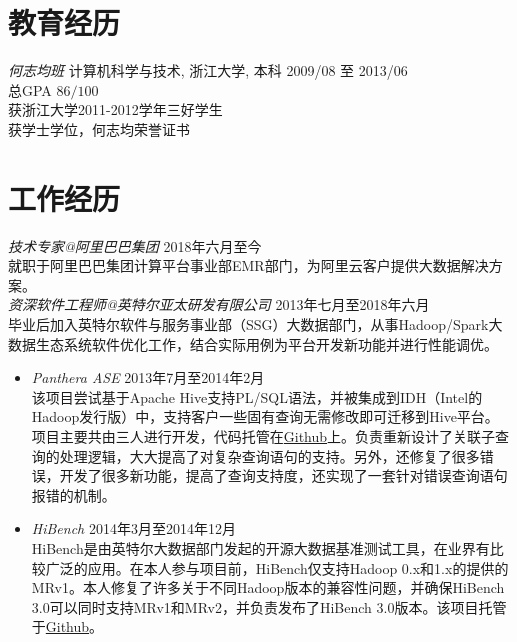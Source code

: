 \documentclass[line,margin]{res}
\begin{document}
\address{联系电话:\sl +86-152-1686-1267}
\address{E-mail:\sl me at daoyuan.wang}


\begin{resume}

\section{教育经历} {\sl 何志均班} 计算机科学与技术, 浙江大学, 本科 \hfill 2009/08 至 2013/06\\
                总GPA $86/100$\\
                获浙江大学2011-2012学年三好学生\\
                获学士学位，何志均荣誉证书\\

\section{工作经历} 
    {\sl 技术专家@阿里巴巴集团} \hfill         2018年六月至今\\
    就职于阿里巴巴集团计算平台事业部EMR部门，为阿里云客户提供大数据解决方案。\\

    {\sl 资深软件工程师@英特尔亚太研发有限公司} \hfill         2013年七月至2018年六月\\
    毕业后加入英特尔软件与服务事业部（SSG）大数据部门，从事Hadoop/Spark大数据生态系统软件优化工作，结合实际用例为平台开发新功能并进行性能调优。\\
        \begin{itemize}
            \item{\sl Panthera ASE} \hfill        2013年7月至2014年2月\\
                该项目尝试基于Apache Hive支持PL/SQL语法，并被集成到IDH（Intel的Hadoop发行版）中，支持客户一些固有查询无需修改即可迁移到Hive平台。项目主要共由三人进行开发，代码托管在\href{https://github.com/intel-hadoop/project-panthera}{Github}上。负责重新设计了关联子查询的处理逻辑，大大提高了对复杂查询语句的支持。另外，还修复了很多错误，开发了很多新功能，提高了查询支持度，还实现了一套针对错误查询语句报错的机制。\\

             \item{\sl HiBench} \hfill        2014年3月至2014年12月\\
                HiBench是由英特尔大数据部门发起的开源大数据基准测试工具，在业界有比较广泛的应用。在本人参与项目前，HiBench仅支持Hadoop 0.x和1.x的提供的MRv1。本人修复了许多关于不同Hadoop版本的兼容性问题，并确保HiBench 3.0可以同时支持MRv1和MRv2，并负责发布了HiBench 3.0版本。该项目托管于\href{https://github.com/intel-hadoop/HiBench}{Github}。\\
                   

\end{itemize}
\end{resume}
\end{document}
